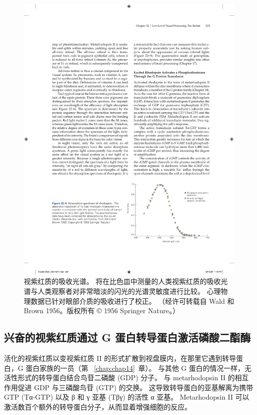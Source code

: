 \begin{figure}[htbp]
	\centering
	\includegraphics[width=1.0\linewidth]{chap22/fig_22_9}
	\caption{视紫红质的吸收光谱。 
		将在比色皿中测量的人类视紫红质的吸收光谱与人类观察者对非常暗淡的闪光的光谱灵敏度进行比较。 
		心理物理数据已针对眼部介质的吸收进行了校正。 （经许可转载自 Wald 和 Brown 1956。版权所有 © 1956 Springer Nature。）}
	\label{fig:22_9}
\end{figure}



\subsection{兴奋的视紫红质通过 G 蛋白转导蛋白激活磷酸二酯酶}

活化的视紫红质以变视紫红质 II 的形式扩散到视盘膜内，在那里它遇到转导蛋白，G 蛋白家族的一员（第 ~\ref{chap:chap14}~章）。
与其他 G 蛋白的情况一样，无活性形式的转导蛋白结合鸟苷二磷酸 (GDP) 分子。
与 metarhodopsin II 的相互作用促进 GDP 与三磷酸鸟苷 (GTP) 的交换。
这导致转导蛋白的亚基解离为携带 GTP (Tα-GTP) 以及 β 和 γ 亚基 (Tβγ) 的活性 α 亚基。
Metarhodopsin II 可以激活数百个额外的转导蛋白分子，从而显着增强细胞的反应。



